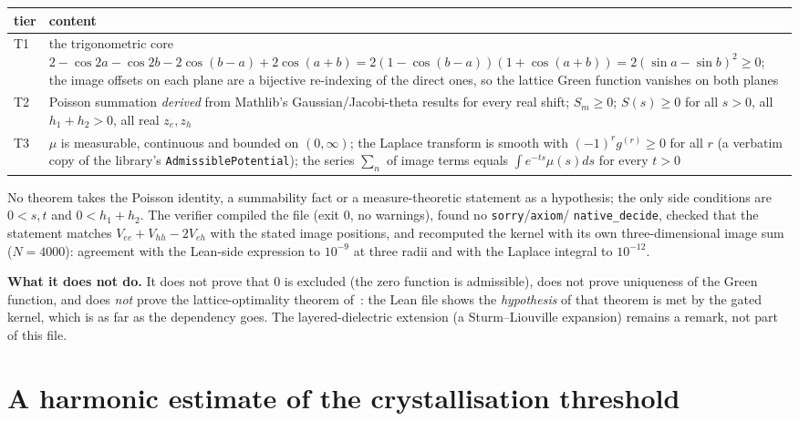 \documentclass[11pt,a4paper]{article}
\begin{document}
\begin{center}\small
\begin{tabular}{@{}p{}p{}@{}}
\toprule
tier & content \\ \midrule
T1 & the trigonometric core $2-\cos2a-\cos2b-2\cos(b-a)+2\cos(a+b)=2(1-\cos(b-a))(1+\cos(a+b))=2(\sin a-\sin b)^2\ge0$; the image
offsets on each plane are a bijective re-indexing of the direct ones, so the lattice Green function vanishes on both planes \\
T2 & Poisson summation \emph{derived} from Mathlib's Gaussian/Jacobi-theta results for every real shift; $S_m\ge0$; $S(s)\ge0$ for all
$s>0$, all $h_1+h_2>0$, all real $z_e,z_h$ \\
T3 & $\mu$ is measurable, continuous and bounded on $(0,\infty)$; the Laplace transform is smooth with $(-1)^rg^{(r)}\ge0$ for all $r$
(a verbatim copy of the library's \texttt{AdmissiblePotential}); the series $\sum_n$ of image terms equals $\int e^{-ts}\mu(s)ds$ for every $t>0$ \\
\bottomrule
\end{tabular}
\end{center}

No theorem takes the Poisson identity, a summability fact or a measure-theoretic statement as a hypothesis; the only side conditions
are $0<s,t$ and $0<h_1+h_2$. The verifier compiled the file (exit 0, no warnings), found no \texttt{sorry}/\texttt{axiom}/
\texttt{native\_decide}, checked that the statement matches $V_{ee}+V_{hh}-2V_{eh}$ with the stated image positions, and
recomputed the kernel with its own three-dimensional image sum ($N=4000$): agreement with the Lean-side expression to $10^{-9}$ at three
radii and with the Laplace integral to $10^{-12}$.

\textbf{What it does not do.} It does not prove that 0 is excluded (the zero function is admissible), does not prove uniqueness of the
Green function, and does \emph{not} prove the lattice-optimality theorem of~\cite{OpenAI2026}: the Lean file shows the \emph{hypothesis}
of that theorem is met by the gated kernel, which is as far as the dependency goes. The layered-dielectric extension (a
Sturm--Liouville expansion) remains a remark, not part of this file.

\section{A harmonic estimate of the crystallisation threshold}\label{sec:wigner}
\end{document}
